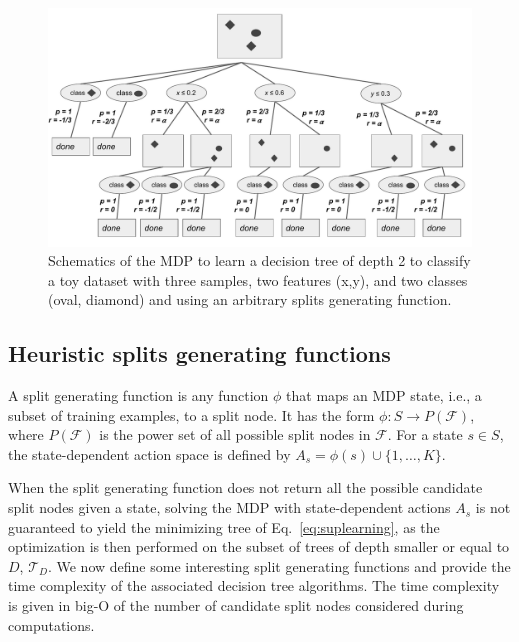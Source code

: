 \begin{figure}
      \centering
      \includegraphics[width=0.9\linewidth]{images/figures/schema_mdp.pdf}
      \caption{Schematics of the MDP to learn a decision tree of depth 2 to classify a toy dataset with three samples, two features (x,y), and two classes (oval, diamond) and using an arbitrary splits generating function.}
      \end{figure}

\subsection{Heuristic splits generating functions}\label{sec:testgen}

A split generating function is any function $\phi$ that maps an MDP state, i.e., a subset of training examples, to a split node. It has the form $\phi: S \rightarrow P(\mathcal{F})$, where $P(\mathcal{F})$ is the power set of all possible split nodes in $\mathcal F$. 
For a state $s \in S$, the state-dependent action space is defined by $A_s = \phi(s) \cup  \{1,\ldots,K\}$. 

When the split generating function does not return all the possible candidate split nodes given a state, solving the MDP with state-dependent actions $A_s$ is not guaranteed to yield the minimizing tree of Eq.~\ref{eq:suplearning}, as the 
optimization is then performed on the subset of trees of depth smaller or equal to $D$, $\mathcal{T}_D$. 
We now define some interesting split generating functions and provide the time complexity of the associated decision tree algorithms. The time complexity is given in big-O of the number of candidate split nodes considered during computations. 

